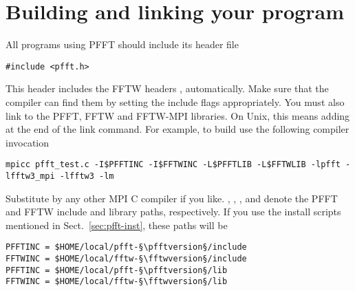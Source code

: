 \section{Building and linking your program}
All programs using PFFT should include its header file
\begin{lstlisting}
#include <pfft.h>
\end{lstlisting}
This header includes the FFTW headers ,  automatically. Make sure that the compiler can find them by setting
the include flags appropriately.
You must also link to the PFFT, FFTW and FFTW-MPI libraries. On Unix, this means adding  at the end of the link command.
For example, to build  use the following compiler invocation
\begin{lstlisting}[prebreak = {\textbackslash}]
mpicc pfft_test.c -I$PFFTINC -I$FFTWINC -L$PFFTLIB -L$FFTWLIB -lpfft -lfftw3_mpi -lfftw3 -lm
\end{lstlisting}
Substitute  by any other MPI C compiler if you like.
, , , and  denote the PFFT and FFTW include and library paths, respectively.
If you use the install scripts mentioned in Sect.~\ref{sec:pfft-inst}, these paths will be
\begin{lstlisting}[escapechar=§,numbers=none]
PFFTINC = $HOME/local/pfft-§\pfftversion§/include
FFTWINC = $HOME/local/fftw-§\fftwversion§/include
PFFTINC = $HOME/local/pfft-§\pfftversion§/lib
FFTWINC = $HOME/local/fftw-§\fftwversion§/lib
\end{lstlisting}


